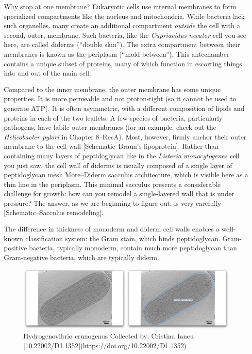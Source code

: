 \documentclass[]{tufte-book}
\begin{document}
Why stop at one membrane? Eukaryotic cells use internal membranes to
form specialized compartments like the nucleus and mitochondria. While
bacteria lack such organelles, many create an additional compartment
\emph{outside} the cell with a second, outer, membrane. Such bacteria,
like the \emph{Cupriavidus necator} cell you see here, are called
diderms (``double skin''). The extra compartment between their membranes
is known as the periplasm (``mold between''). This antechamber contains
a unique subset of proteins, many of which function in escorting things
into and out of the main cell.

Compared to the inner membrane, the outer membrane has some unique
properties. It is more permeable and not proton-tight (so it cannot be
used to generate ATP). It is often asymmetric, with a different
composition of lipids and proteins in each of the two leaflets. A few
species of bacteria, particularly pathogens, have labile outer membranes
(for an example, check out the \emph{Helicobacter pylori} in Chapter
8--RecA). Most, however, firmly anchor their outer membrane to the cell
wall {[}Schematic--Braun's lipoprotein{]}. Rather than containing many
layers of peptidoglycan like in the \emph{Listeria monocytogenes} cell
you just saw, the cell wall of diderms is usually composed of a single
layer of peptidoglycan mesh
\protect\hyperlink{morediderm-sacculus-architecture}{More--Diderm
sacculus architecture}, which is visible here as a thin line in the
periplasm. This minimal sacculus presents a considerable challenge for
growth: how can you remodel a single-layered wall that is under
pressure? The answer, as we are beginning to figure out, is very
carefully {[}Schematic--Sacculus remodeling{]}.

The difference in thickness of monoderm and diderm cell walls enables a
well-known classification system: the Gram stain, which binds
peptidoglycan. Gram-positive bacteria, typically monoderm, contain much
more peptidoglycan than Gram-negative bacteria, which are typically
diderm.

\begin{figure}
\includegraphics{movie_stills/2_3} \caption[Hydrogenovibrio crunogenus Collected by]{Hydrogenovibrio crunogenus Collected by: Cristina Iancu [10.22002/D1.1352](https://doi.org/10.22002/D1.1352)}\label{fig:unnamed-chunk-23}
\end{figure}
\end{document}
